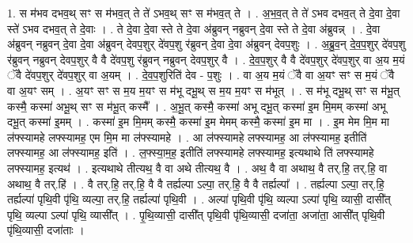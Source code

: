 \documentclass[17pt]{extarticle}
\begin{document}
1. स म॑भव दभव॒थ् सꣳ स म॑भव॒त् ते ते॑ ऽभव॒थ् सꣳ स म॑भव॒त् ते । . अ॒भ॒व॒त् ते ते॑ ऽभव दभव॒त् ते दे॒वा दे॒वा स्ते॑ ऽभव दभव॒त् ते दे॒वाः । . ते दे॒वा दे॒वा स्ते ते दे॒वा अ॑ब्रुवन् नब्रुवन् दे॒वा स्ते ते दे॒वा अ॑ब्रुवन्न् । . दे॒वा अ॑ब्रुवन् नब्रुवन् दे॒वा दे॒वा अ॑ब्रुवन् देवप॒शुर् दे॑वप॒शु र॑ब्रुवन् दे॒वा दे॒वा अ॑ब्रुवन् देवप॒शुः । . अ॒ब्रु॒व॒न् दे॒व॒प॒शुर् दे॑वप॒शु र॑ब्रुवन् नब्रुवन् देवप॒शुर् वै वै दे॑वप॒शु र॑ब्रुवन् नब्रुवन् देवप॒शुर् वै । . दे॒व॒प॒शुर् वै वै दे॑वप॒शुर् दे॑वप॒शुर् वा अ॒य म॒यं ॅवै दे॑वप॒शुर् दे॑वप॒शुर् वा अ॒यम् । . दे॒व॒प॒शुरिति॑ देव - प॒शुः । . वा अ॒य म॒यं ॅवै वा अ॒यꣳ सꣳ स म॒यं ॅवै वा अ॒यꣳ सम् । . अ॒यꣳ सꣳ स म॒य म॒यꣳ स म॑भू दभू॒थ् स म॒य म॒यꣳ स म॑भूत् । . स म॑भू दभू॒थ् सꣳ स म॑भू॒त् कस्मै॒ कस्मा॑ अभू॒थ् सꣳ स म॑भू॒त् कस्मै᳚ । . अ॒भू॒त् कस्मै॒ कस्मा॑ अभू दभू॒त् कस्मा॑ इ॒म मि॒मम् कस्मा॑ अभू दभू॒त् कस्मा॑ इ॒मम् । . कस्मा॑ इ॒म मि॒मम् कस्मै॒ कस्मा॑ इ॒म मेमम् कस्मै॒ कस्मा॑ इ॒म मा । . इ॒म मेम मि॒म मा ल॑फ्स्यामहे लफ्स्यामह॒ एम मि॒म मा ल॑फ्स्यामहे । . आ ल॑फ्स्यामहे लफ्स्यामह॒ आ ल॑फ्स्यामह॒ इतीति॑ लफ्स्यामह॒ आ ल॑फ्स्यामह॒ इति॑ । . ल॒फ्स्या॒म॒ह॒ इतीति॑ लफ्स्यामहे लफ्स्यामह॒ इत्यथाथे ति॑ लफ्स्यामहे लफ्स्यामह॒ इत्यथ॑ । . इत्यथाथे तीत्यथ॒ वै वा अथे तीत्यथ॒ वै । . अथ॒ वै वा अथाथ॒ वै तर्.हि॒ तर्.हि॒ वा अथाथ॒ वै तर्.हि॑ । . वै तर्.हि॒ तर्.हि॒ वै वै तर्ह्यल्पा ऽल्पा॒ तर्.हि॒ वै वै तर्ह्यल्पा᳚ । . तर्ह्यल्पा ऽल्पा॒ तर्.हि॒ तर्ह्यल्पा॑ पृथि॒वी पृ॑थि॒ व्यल्पा॒ तर्.हि॒ तर्ह्यल्पा॑ पृथि॒वी । . अल्पा॑ पृथि॒वी पृ॑थि॒ व्यल्पा ऽल्पा॑ पृथि॒ व्यासी॒ दासी᳚त् पृथि॒ व्यल्पा ऽल्पा॑ पृथि॒ व्यासी᳚त् । . पृ॒थि॒व्यासी॒ दासी᳚त् पृथि॒वी पृ॑थि॒व्यासी॒ दजा॑ता॒ अजा॑ता॒ आसी᳚त् पृथि॒वी पृ॑थि॒व्यासी॒ दजा॑ताः । \newline
\end{document}

